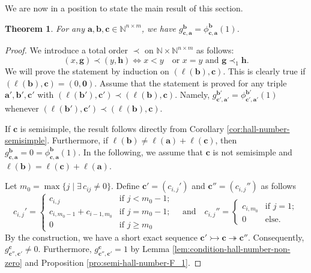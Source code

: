 \documentclass[12pt]{amsart}
\newtheorem{theorem}{Theorem}[section]
\theoremstyle{remark}
\theoremstyle{definition}
\numberwithin{equation}{section}
\begin{document}
We are now in a position to state the main result of this section.
\begin{theorem}\label{thm:equality-hall-numbers}
For any $\mathbf{a},\mathbf{b},\mathbf{c}\in \mathbb{N}^{n\times m}$,  we have $g_{\mathbf{c},\mathbf{a}}^{\mathbf{b}}=\phi_{\mathbf{c},\mathbf{a}}^{\mathbf{b}}(1)$.
\end{theorem}
\begin{proof}
We introduce a total order $\prec$ on $\mathbb{N}\times \mathbb{N}^{n\times m}$ as follows:
\[
(x,\mathbf{g})\prec (y,\mathbf{h}) \Leftrightarrow x<y \quad \text{or $x=y$ and $\mathbf{g}\prec_1\mathbf{h}$}.
\]
We will prove the statement by induction on $(\ell(\mathbf{b}), \mathbf{c})$. This is clearly true if $(\ell(\mathbf{b}), \mathbf{c})=(0,\mathbf{0})$. Assume that the statement is proved for any triple $\mathbf{a}',\mathbf{b}', \mathbf{c}'$ with $(\ell(\mathbf{b}'), \mathbf{c}')\prec (\ell(\mathbf{b}), \mathbf{c})$. Namely, $g_{\mathbf{c}',\mathbf{a}'}^{\mathbf{b}'}=\phi_{\mathbf{c}',\mathbf{a}'}^{\mathbf{b}'}(1)$
whenever $(\ell(\mathbf{b}'),\mathbf{c}')\prec (\ell(\mathbf{b}),\mathbf{c})$. 


If $\mathbf{c}$ is semisimple, the result follows directly from Corollary \ref{cor:hall-number-semisimple}. Furthermore, if $\ell(\mathbf{b})\neq \ell(\mathbf{a})+\ell(\mathbf{c})$, then $g_{\mathbf{c},\mathbf{a}}^{\mathbf{b}}=0=\phi_{\mathbf{c},\mathbf{a}}^{\mathbf{b}}(1)$.
In the following, we assume that $\mathbf{c}$ is not semisimple and $\ell(\mathbf{b})=\ell(\mathbf{c})+\ell(\mathbf{a})$.


Let $m_0=\max\{j\mid \exists\, c_{ij}\neq 0\}$. Define $\mathbf{c}'=(c_{i,j}')$ and $\mathbf{c}''=(c_{i,j}'')$ as follows
\[
c_{i,j}'=\begin{cases}
    c_{i,j}&\text{if $j<m_0-1$};\\
    c_{i,m_0-1}+c_{i-1,m_0}&\text{if $j=m_0-1$};\\
    0&\text{if $j\ge m_0$}
\end{cases}\quad \text{and}\quad c_{i,j}''=\begin{cases}
    c_{i,m_0}&\text{if $j=1$};\\
    0&\text{else}.
\end{cases}
\]
By the construction, we have a short exact sequence $\mathbf{c}'\rightarrowtail \mathbf{c}\twoheadrightarrow \mathbf{c}''$. Consequently, $g_{\mathbf{c}'',\mathbf{c}'}^\mathbf{c}\neq 0$. Furthermore,  $g_{\mathbf{c}'',\mathbf{c}'}^\mathbf{c}=1$ by Lemma \ref{lem:condition-hall-number-non-zero} and Proposition \ref{pro:semi-hall-number-F_1}.



\end{proof}
\end{document}
